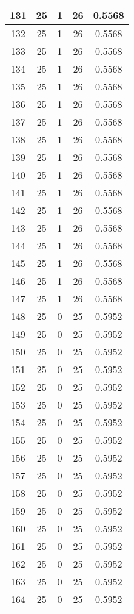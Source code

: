 \documentclass[letterpaper, 12pt]{article}
\begin{document}
\begin{longtable}{|c|c|c|c|c|}
\hline
131 & 25 & 1 & 26 & 0.5568 \\
\hline
132 & 25 & 1 & 26 & 0.5568 \\
\hline
133 & 25 & 1 & 26 & 0.5568 \\
\hline
134 & 25 & 1 & 26 & 0.5568 \\
\hline
135 & 25 & 1 & 26 & 0.5568 \\
\hline
136 & 25 & 1 & 26 & 0.5568 \\
\hline
137 & 25 & 1 & 26 & 0.5568 \\
\hline
138 & 25 & 1 & 26 & 0.5568 \\
\hline
139 & 25 & 1 & 26 & 0.5568 \\
\hline
140 & 25 & 1 & 26 & 0.5568 \\
\hline
141 & 25 & 1 & 26 & 0.5568 \\
\hline
142 & 25 & 1 & 26 & 0.5568 \\
\hline
143 & 25 & 1 & 26 & 0.5568 \\
\hline
144 & 25 & 1 & 26 & 0.5568 \\
\hline
145 & 25 & 1 & 26 & 0.5568 \\
\hline
146 & 25 & 1 & 26 & 0.5568 \\
\hline
147 & 25 & 1 & 26 & 0.5568 \\
\hline
148 & 25 & 0 & 25 & 0.5952 \\
\hline
149 & 25 & 0 & 25 & 0.5952 \\
\hline
150 & 25 & 0 & 25 & 0.5952 \\
\hline
151 & 25 & 0 & 25 & 0.5952 \\
\hline
152 & 25 & 0 & 25 & 0.5952 \\
\hline
153 & 25 & 0 & 25 & 0.5952 \\
\hline
154 & 25 & 0 & 25 & 0.5952 \\
\hline
155 & 25 & 0 & 25 & 0.5952 \\
\hline
156 & 25 & 0 & 25 & 0.5952 \\
\hline
157 & 25 & 0 & 25 & 0.5952 \\
\hline
158 & 25 & 0 & 25 & 0.5952 \\
\hline
159 & 25 & 0 & 25 & 0.5952 \\
\hline
160 & 25 & 0 & 25 & 0.5952 \\
\hline
161 & 25 & 0 & 25 & 0.5952 \\
\hline
162 & 25 & 0 & 25 & 0.5952 \\
\hline
163 & 25 & 0 & 25 & 0.5952 \\
\hline
164 & 25 & 0 & 25 & 0.5952 \\

\end{longtable}
\end{document}
